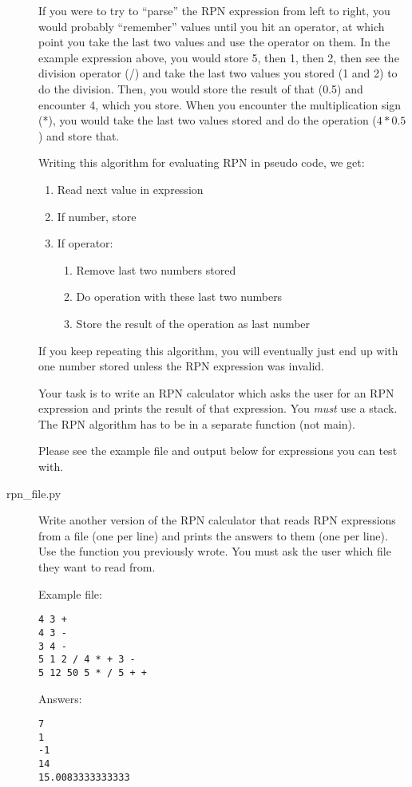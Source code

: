 \documentclass[11pt]{cselabheader}
\begin{document}
\begin{description}
    If you were to try to ``parse'' the RPN expression from left to right, you
    would probably ``remember'' values until you hit an operator, at which point
    you take the last two values and use the operator on them. In the example
    expression above, you would store 5, then 1, then 2, then see the division
    operator (/) and take the last two values you stored (1 and 2) to do the
    division. Then, you would store the result of that (0.5) and encounter
    4, which you store. When you encounter the multiplication sign (*), you
    would take the last two values stored and do the operation ($4 * 0.5$)
    and store that. 

    Writing this algorithm for evaluating RPN in pseudo code, we get:

\begin{enumerate}
  \item Read next value in expression
  \item If number, store
  \item If operator:
    \begin{enumerate}
      \item Remove last two numbers stored
      \item Do operation with these last two numbers
      \item Store the result of the operation as last number
    \end{enumerate}
\end{enumerate}

    If you keep repeating this algorithm, you will eventually just end up with
    one number stored unless the RPN expression was invalid.

    Your task is to write an RPN calculator which asks the user for an RPN
    expression and prints the result of that expression. You \emph{must} use a
    stack. The RPN algorithm has to be in a separate function (not main).

    Please see the example file and output below for expressions you can test
    with.

  \item[rpn\_file.py] Write another version of the RPN calculator that reads
    RPN expressions from a file (one per line) and prints the answers to them
    (one per line). Use the function you previously wrote. You must ask the user
    which file they want to read from.

    Example file:
    \begin{lstlisting}
4 3 +
4 3 -
3 4 -
5 1 2 / 4 * + 3 -
5 12 50 5 * / 5 + +
    \end{lstlisting}

    Answers:
    \begin{lstlisting}
7
1
-1
14
15.0083333333333
    \end{lstlisting}
    
\end{description}
\end{document}
